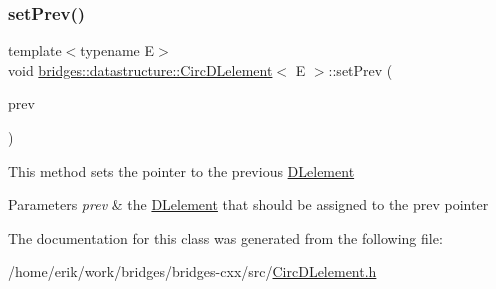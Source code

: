 \subsubsection{\texorpdfstring{set\+Prev()}{setPrev()}}
{\footnotesize\ttfamily template$<$typename E$>$ \\
void \hyperlink{classbridges_1_1datastructure_1_1_circ_d_lelement}{bridges\+::datastructure\+::\+Circ\+D\+Lelement}$<$ E $>$\+::set\+Prev (\begin{DoxyParamCaption}\item[{\hyperlink{classbridges_1_1datastructure_1_1_circ_d_lelement}{Circ\+D\+Lelement}$<$ E $>$ $\ast$}]{prev }\end{DoxyParamCaption})\hspace{0.3cm}{\ttfamily [inline]}}

This method sets the pointer to the previous \hyperlink{classbridges_1_1datastructure_1_1_d_lelement}{D\+Lelement} 
\begin{DoxyParams}{Parameters}
{\em prev} & the \hyperlink{classbridges_1_1datastructure_1_1_d_lelement}{D\+Lelement} that should be assigned to the prev pointer \\
\hline
\end{DoxyParams}


The documentation for this class was generated from the following file\+:\begin{DoxyCompactItemize}
\item 
/home/erik/work/bridges/bridges-\/cxx/src/\hyperlink{_circ_d_lelement_8h}{Circ\+D\+Lelement.\+h}\end{DoxyCompactItemize}

